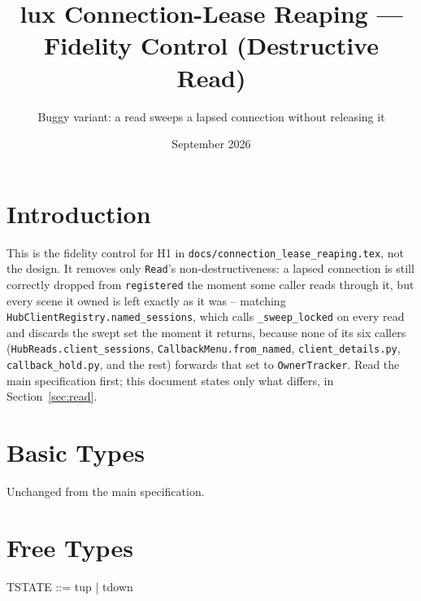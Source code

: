 \documentclass[a4paper,10pt,fleqn]{article}
\begin{document}
\title{lux Connection-Lease Reaping --- Fidelity Control (Destructive Read)}
\author{Buggy variant: a read sweeps a lapsed connection without releasing it}
\date{September 2026}
\maketitle

\section{Introduction}

This is the fidelity control for H1 in
\texttt{docs/connection\_lease\_reaping.tex}, not the design. It removes
only \texttt{Read}'s non-destructiveness: a lapsed connection is still
correctly dropped from \texttt{registered} the moment some caller reads
through it, but every scene it owned is left exactly as it was --
matching \texttt{HubClientRegistry.named\_sessions}, which calls
\texttt{\_sweep\_locked} on every read and discards the swept set the
moment it returns, because none of its six callers
(\texttt{HubReads.client\_sessions}, \texttt{CallbackMenu.from\_named},
\texttt{client\_details.py}, \texttt{callback\_hold.py}, and the rest)
forwards that set to \texttt{OwnerTracker}. Read the main specification
first; this document states only what differs, in
Section~\ref{sec:read}.

\section{Basic Types}

\begin{zed}
\end{zed}

Unchanged from the main specification.

\section{Free Types}

\begin{zed}
  TSTATE ::= tup | tdown
\end{zed}
\end{document}
